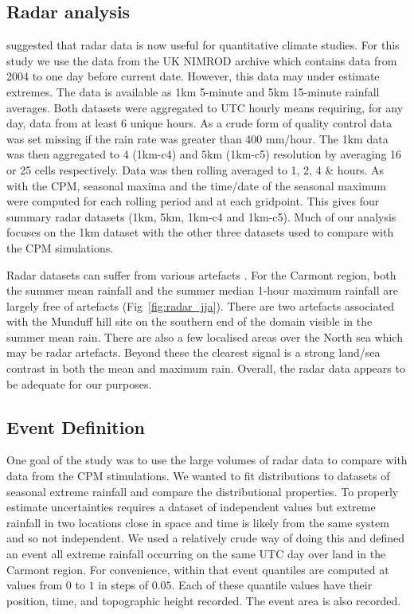 \documentclass[11pt,a4paper]{article}
\begin{document}
\subsection{Radar analysis}
\cite{saltikoff2019radar_climate} suggested that radar data is now useful for quantitative climate studies.   For this study we use the data from the UK NIMROD archive which contains data from 2004 to one day before current date\parencite{radar_data}. However, this data may under estimate extremes\parencite{harrison2000nimrod}. The data is available  as  1km 5-minute and 5km 15-minute rainfall averages.  Both datasets  were aggregated to UTC hourly means requiring, for any day, data from at least 6  unique hours. As a crude form of quality control data was set missing if the rain rate was greater than 400 mm/hour.  The 1km data was then aggregated to 4 (1km-c4) and 5km (1km-c5) resolution by averaging 16 or 25 cells respectively. Data was then rolling averaged to 1, 2, 4 \& hours. As with the CPM,  seasonal maxima and the time/date of the seasonal maximum were computed for each rolling period and at each gridpoint. This gives four summary radar datasets (1km, 5km,  1km-c4 and  1km-c5). Much of our analysis focuses on the 1km dataset with the  other three datasets used to compare with the CPM simulations. 

Radar datasets can suffer from various artefacts \parencite{Overeem2023euradclim}.
For the Carmont region, both the summer mean rainfall and the summer median 1-hour maximum rainfall are largely free of artefacts (Fig~\ref{fig:radar_jja}). There are two artefacts associated with the Munduff hill site on the southern end of the domain visible in the summer mean rain. There are also a few localised areas over the North sea which may be radar artefacts.  Beyond these the clearest signal is a strong land/sea contrast in both the mean and maximum rain. Overall, the radar data appears to be adequate for our purposes.  


\subsection{Event Definition}

One goal of the study was to use the large volumes of radar data to compare with data from the CPM stimulations. We  wanted  to fit distributions to  datasets of seasonal extreme rainfall and compare the distributional properties. To properly estimate uncertainties requires a dataset of independent values but extreme rainfall in two locations close in space and time is likely from the same system and so not independent. We used a relatively crude way of doing this and defined an event  all extreme rainfall occurring on the same UTC day over land in the Carmont region.  For convenience, within that event quantiles are computed at values from $0$ to $1$ in steps of $0.05$. Each of these quantile values have their position, time, and topographic height recorded. The event area is also recorded.  
\end{document}
